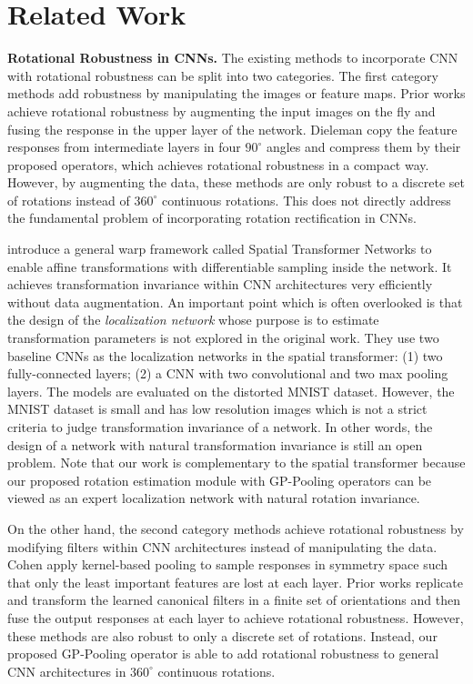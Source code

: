 \documentclass[10pt,twocolumn,letterpaper]{article}
\begin{document}
\section{Related Work}

\noindent\textbf{Rotational Robustness in CNNs.} The existing methods to incorporate CNN with rotational robustness can be split into two categories. The first category methods add robustness by manipulating the images or feature maps. Prior works \cite{Cheng2016, Laptev2016, Henriques2016, Gatica-perez, Laptev2015} achieve rotational robustness by augmenting the input images on the fly and fusing the response in the upper layer of the network. Dieleman \etal \cite{Dieleman2016} copy the feature responses from intermediate layers in four $90^{\circ}$ angles and compress them by their proposed operators, which achieves rotational robustness in a compact way. However, by augmenting the data, these methods are only robust to a discrete set of rotations instead of $360^{\circ}$ continuous rotations. This does not directly address the fundamental problem of incorporating rotation rectification in CNNs.

\cite{Jaderberg2015} introduce a general warp framework called Spatial Transformer Networks to enable affine transformations with differentiable sampling inside the network. It achieves transformation invariance within CNN architectures very efficiently without data augmentation. An important point which is often overlooked is that the design of the \textit{localization network} whose purpose is to estimate transformation parameters is not explored in the original work. They use two baseline CNNs as the localization networks in the spatial transformer: (1) two fully-connected layers; (2) a CNN with two convolutional and two max pooling layers. The models are evaluated on the distorted MNIST dataset. However, the MNIST dataset is small and has low resolution images which is not a strict criteria to judge transformation invariance of a network. In other words, the design of a network with natural transformation invariance is still an open problem. Note that our work is complementary to the spatial transformer because our proposed rotation estimation module with GP-Pooling operators can be viewed as an expert localization network with natural rotation invariance.

On the other hand, the second category methods achieve rotational robustness by modifying filters within CNN architectures instead of manipulating the data. Cohen \etal \cite{Cohen2016, Cohen2017} apply kernel-based pooling to sample responses in symmetry space such that only the least important features are lost at each layer. Prior works \cite{Marcos2016, Zhou, Marcos2016texture, And2015} replicate and transform the learned canonical filters in a finite set of orientations and then fuse the output responses at each layer to achieve rotational robustness. However, these methods are also robust to only a discrete set of rotations. Instead, our proposed GP-Pooling operator is able to add rotational robustness to general CNN architectures in $360^{\circ}$ continuous rotations.
\end{document}
